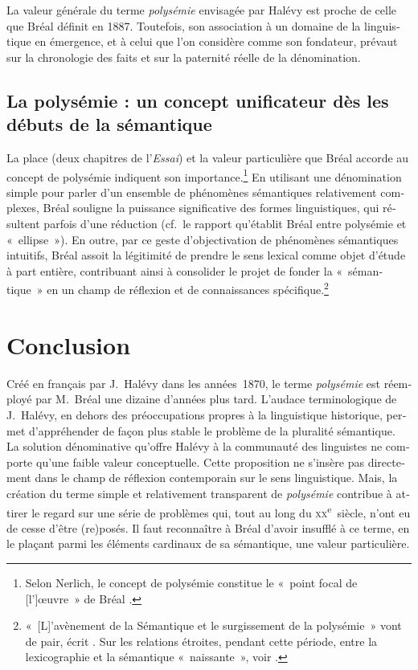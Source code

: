 \documentclass[output=paper]{langsci/langscibook}
\begin{document}
\begin{otherlanguage}{french}
La valeur générale du terme \textit{polysémie} envisagée par Halévy est proche de celle que Bréal définit en 1887. Toutefois, son association à un domaine de la linguistique en émergence, et à celui que l’on considère comme son fondateur, prévaut sur la chronologie des faits et sur la paternité réelle de la dénomination.

\subsection{La polysémie : un concept unificateur dès les débuts de la sémantique}

La place (deux chapitres de l’\textit{Essai}) et la valeur particulière que Bréal accorde au concept de polysémie indiquent son importance.\footnote{Selon Nerlich, le concept de polysémie constitue le «~point focal de [l’]œuvre~» de Bréal \citep[22]{nerlich_avant-propos_1993}.} En utilisant une dénomination simple pour parler d’un ensemble de phénomènes sémantiques relativement complexes, Bréal souligne la puissance significative des formes linguistiques, qui résultent parfois d’une réduction (cf.~le rapport qu’établit Bréal entre polysémie et «~ellipse~»). En outre, par ce geste d’objectivation de phénomènes sémantiques intuitifs, Bréal assoit la légitimité de prendre le sens lexical comme objet d’étude à part entière, contribuant ainsi à consolider le projet de fonder la «~sémantique~» en un champ de réflexion et de connaissances spécifique.\footnote{«~[L]’avènement de la Sémantique et le surgissement de la polysémie~» vont de pair, écrit \citet[83]{delesalle_vie_1987}. Sur les relations étroites, pendant cette période, entre la lexicographie et la sémantique «~naissante~», voir \citealt{bisconti_sens_2016}.}

\section{Conclusion}

Créé en français par J.~Halévy dans les années~1870, le terme \textit{polysémie} est réemployé par M.~Bréal une dizaine d’années plus tard. L’audace terminologique de J.~Halévy, en dehors des préoccupations propres à la linguistique historique, permet d’appréhender de façon plus stable le problème de la pluralité sémantique. La solution dénominative qu’offre Halévy à la communauté des linguistes ne comporte qu’une faible valeur conceptuelle. Cette proposition ne s’insère pas directement dans le champ de réflexion contemporain sur le sens linguistique. Mais, la création du terme simple et relativement transparent de \textit{polysémie} contribue à attirer le regard sur une série de problèmes qui, tout au long du \textsc{xx}\textsuperscript{e}~siècle, n’ont eu de cesse d’être (re)posés. Il faut reconnaître à Bréal d’avoir insufflé à ce terme, en le plaçant parmi les éléments cardinaux de sa sémantique, une valeur particulière.


\end{otherlanguage}
\end{document}
